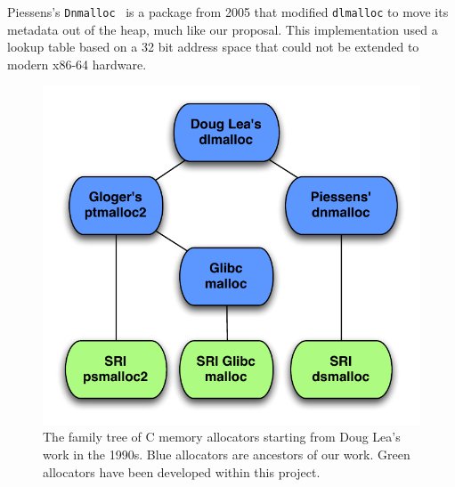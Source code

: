 \documentclass[12pt]{cslreport}
\begin{document}
Piessens's \texttt{Dnmalloc}~\cite{YJP06} is a package from 2005 that modified
\texttt{dlmalloc} to move its metadata out of the heap, much like our
proposal. This implementation used a lookup table based on a 32 bit address
space that could not be extended to modern x86-64 hardware.


\begin{figure}[h]
\begin{center}
\includegraphics{OurFamilyTree.pdf}
\end{center}
\caption[The family tree of C memory allocators.]{The family tree of C
  memory allocators starting from Doug Lea's work in the 1990s. Blue
  allocators are ancestors of our work.  Green allocators have been
  developed within this project.}
\label{fig:tree}
\end{figure}
\end{document}
